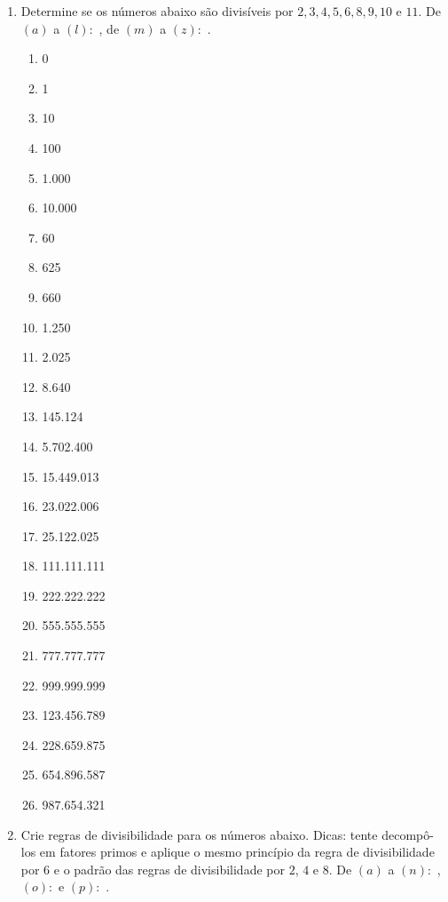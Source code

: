 \documentclass[12pt]{report}
\newcommand{\1}{\faThermometerEmpty}
\newcommand{\2}{\faThermometerQuarter}
\newcommand{\3}{\faThermometerHalf}
\newcommand{\4}{\faThermometerThreeQuarters}
\newcommand{\5}{\faThermometerFull}
\begin{document}
\begin{enumerate}
\item Determine se os números abaixo são divisíveis por $2,3,4,5,6,8,9,10$ e $11$. De $(a)$ a $(l):$ \1, de $(m)$ a $(z):$ \2.
\begin{multicols}{4}
  \begin{enumerate}
    \item 0  
    \item 1
    \item 10
    \item 100
    \item 1.000
    \item 10.000
    \item 60
    \item 625
    \item 660
    \item 1.250
    \item 2.025
    \item 8.640    
    \item 145.124
    \item 5.702.400
    \item 15.449.013    
    \item 23.022.006
    \item 25.122.025
    \item 111.111.111
    \item 222.222.222
    \item 555.555.555
    \item 777.777.777
    \item 999.999.999
    \item 123.456.789
    \item 228.659.875
    \item 654.896.587
    \item 987.654.321
    \end{enumerate}
\end{multicols}


\item Crie regras de divisibilidade para os números abaixo. Dicas: tente decompô-los em fatores primos e aplique o mesmo princípio da regra de divisibilidade por 6 e o padrão das regras de divisibilidade por $2$, $4$ e $8$. De $(a)$ a $(n):$ \2, $(o):$ \3 e $(p):$ \4.


\end{enumerate}
\end{document}
